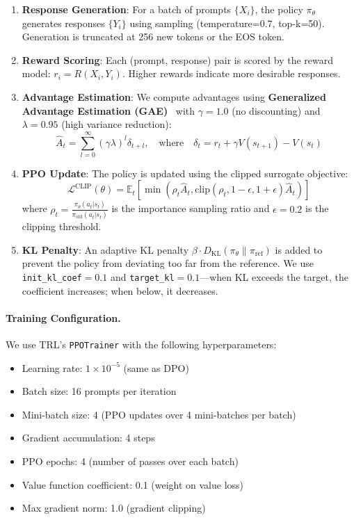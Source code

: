 \begin{enumerate}[leftmargin=*]
    \item \textbf{Response Generation}: For a batch of prompts $\{X_i\}$, the policy $\pi_\theta$ generates responses $\{Y_i\}$ using sampling (temperature=0.7, top-k=50). Generation is truncated at 256 new tokens or the EOS token.

    \item \textbf{Reward Scoring}: Each (prompt, response) pair is scored by the reward model: $r_i = R(X_i, Y_i)$. Higher rewards indicate more desirable responses.

    \item \textbf{Advantage Estimation}: We compute advantages using \textbf{Generalized Advantage Estimation (GAE)}~\cite{schulman2015high} with $\gamma=1.0$ (no discounting) and $\lambda=0.95$ (high variance reduction):
    \begin{equation}
        \hat{A}_t = \sum_{l=0}^{\infty} (\gamma \lambda)^l \delta_{t+l}, \quad \text{where} \quad \delta_t = r_t + \gamma V(s_{t+1}) - V(s_t)
    \end{equation}

    \item \textbf{PPO Update}: The policy is updated using the clipped surrogate objective:
    \begin{equation}
        \mathcal{L}^{\text{CLIP}}(\theta) = \mathbb{E}_t \left[ \min\left( \rho_t \hat{A}_t, \text{clip}(\rho_t, 1-\epsilon, 1+\epsilon) \hat{A}_t \right) \right]
    \end{equation}
    where $\rho_t = \frac{\pi_\theta(a_t|s_t)}{\pi_{\text{old}}(a_t|s_t)}$ is the importance sampling ratio and $\epsilon=0.2$ is the clipping threshold.

    \item \textbf{KL Penalty}: An adaptive KL penalty $\beta \cdot D_{\text{KL}}(\pi_\theta \| \pi_{\text{ref}})$ is added to prevent the policy from deviating too far from the reference. We use \texttt{init\_kl\_coef}$=0.1$ and \texttt{target\_kl}$=0.1$---when KL exceeds the target, the coefficient increases; when below, it decreases.
\end{enumerate}

\paragraph{Training Configuration.} We use TRL's \texttt{PPOTrainer} with the following hyperparameters:
\begin{itemize}[leftmargin=*]
    \item Learning rate: $1 \times 10^{-5}$ (same as DPO)
    \item Batch size: 16 prompts per iteration
    \item Mini-batch size: 4 (PPO updates over 4 mini-batches per batch)
    \item Gradient accumulation: 4 steps
    \item PPO epochs: 4 (number of passes over each batch)
    \item Value function coefficient: 0.1 (weight on value loss)
    \item Max gradient norm: 1.0 (gradient clipping)
\end{itemize}

